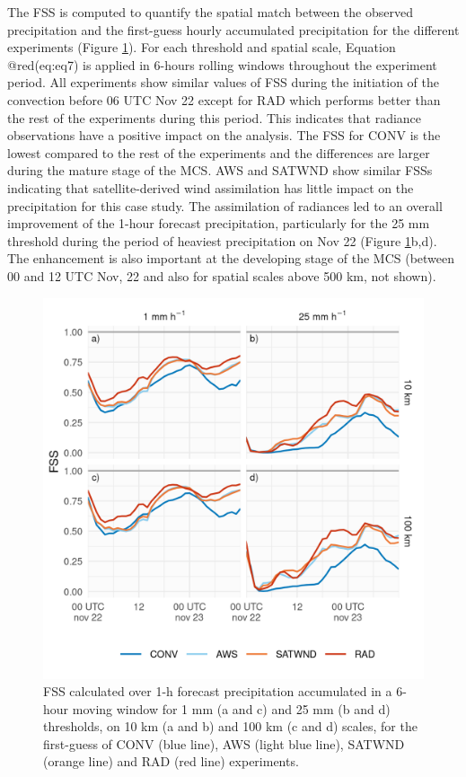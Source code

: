 \documentclass[final,5p,times,twocolumn,authoryear]{elsarticle} %
\begin{document}
The FSS is computed to quantify the spatial match between the observed precipitation and the first-guess hourly accumulated precipitation for the different experiments (Figure \ref{fig:fss}). For each threshold and spatial scale, Equation @red(eq:eq7) is applied in 6-hours rolling windows throughout the experiment period. All experiments show similar values of FSS during the initiation of the convection before 06 UTC Nov 22 except for RAD which performs better than the rest of the experiments during this period. This indicates that radiance observations have a positive impact on the analysis. The FSS for CONV is the lowest compared to the rest of the experiments and the differences are larger during the mature stage of the MCS. AWS and SATWND show similar FSSs indicating that satellite-derived wind assimilation has little impact on the precipitation for this case study. The assimilation of radiances led to an overall improvement of the 1-hour forecast precipitation, particularly for the 25 mm threshold during the period of heaviest precipitation on Nov 22 (Figure \ref{fig:fss}b,d). The enhancement is also important at the developing stage of the MCS (between 00 and 12 UTC Nov, 22 and also for spatial scales above 500 km, not shown).



\begin{figure}
\centering
\includegraphics{../figures/fss-1.png}
\caption{\label{fig:fss}FSS calculated over 1-h forecast precipitation accumulated in a 6-hour moving window for 1 mm (a and c) and 25 mm (b and d) thresholds, on 10 km (a and b) and 100 km (c and d) scales, for the first-guess of CONV (blue line), AWS (light blue line), SATWND (orange line) and RAD (red line) experiments.}
\end{figure}
\end{document}
